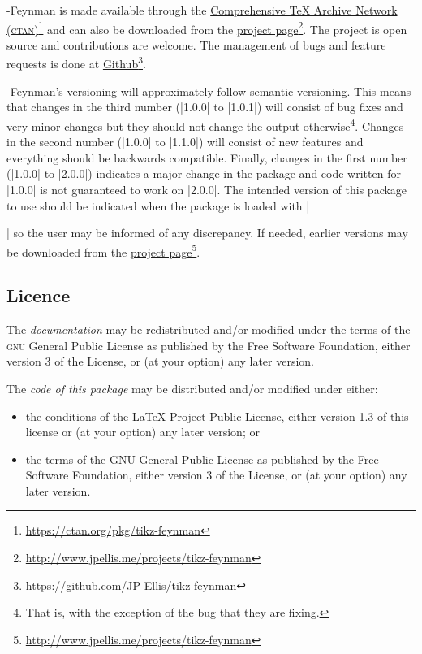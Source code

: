 \documentclass[a4paper,final]{ltxdoc}
\providecommand{\tikzfeynmanname}{\tikzname-Feynman}
\begin{document}
\tikzfeynmanname{} is made available through the
\href{https://ctan.org/pkg/tikz-feynman}{Comprehensive \TeX{} Archive Network
  (\textsc{ctan})}\footnote{\url{https://ctan.org/pkg/tikz-feynman}} and can
also be downloaded from the
\href{http://www.jpellis.me/projects/tikz-feynman}{project
  page}\footnote{\url{http://www.jpellis.me/projects/tikz-feynman}}.  The
project is open source and contributions are welcome.  The management of bugs
and feature requests is done at
\href{https://github.com/JP-Ellis/tikz-feynman}{Github}\footnote{\url{https://github.com/JP-Ellis/tikz-feynman}}.

\tikzfeynmanname{}'s versioning will approximately follow
\href{http://semverg.org}{semantic versioning}.  This means that changes in the
third number (|1.0.0| to |1.0.1|) will consist of bug fixes and very minor
changes but they should not change the output otherwise\footnote{That is, with
  the exception of the bug that they are fixing.}.  Changes in the second number
(|1.0.0| to |1.1.0|) will consist of new features and everything should be
backwards compatible.  Finally, changes in the first number (|1.0.0| to |2.0.0|)
indicates a major change in the package and code written for |1.0.0| is not
guaranteed to work on |2.0.0|.  The intended version of this package to use
should be indicated when the package is loaded with
|\usepackage[compat=x.y.z]{tikz-feynman}| so the user may be informed of any
discrepancy.  If needed, earlier versions may be downloaded from the
\href{http://www.jpellis.me/projects/tikz-feynman}{project
  page}\footnote{\url{http://www.jpellis.me/projects/tikz-feynman}}.

\subsection*{Licence}
\label{subsec:licence}

The \emph{documentation} may be redistributed and/or modified under the terms
of the \textsc{gnu} General Public License as published by the Free Software
Foundation, either version 3 of the License, or (at your option) any later
version.

The \emph{code of this package} may be distributed and/or modified under either:
\begin{itemize}
\item the conditions of the LaTeX Project Public License, either version 1.3 of
  this license or (at your option) any later version; or
\item the terms of the GNU General Public License as published by the Free
  Software Foundation, either version 3 of the License, or (at your option) any
  later version.
\end{itemize}
\end{document}
